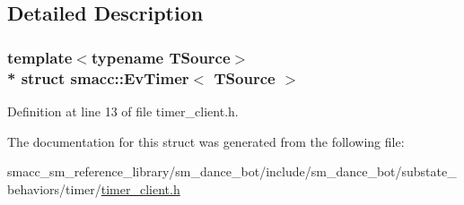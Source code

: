 \subsection{Detailed Description}
\subsubsection*{template$<$typename T\+Source$>$\\*
struct smacc\+::\+Ev\+Timer$<$ T\+Source $>$}



Definition at line 13 of file timer\+\_\+client.\+h.



The documentation for this struct was generated from the following file\+:\begin{DoxyCompactItemize}
\item 
smacc\+\_\+sm\+\_\+reference\+\_\+library/sm\+\_\+dance\+\_\+bot/include/sm\+\_\+dance\+\_\+bot/substate\+\_\+behaviors/timer/\hyperlink{timer__client_8h}{timer\+\_\+client.\+h}\end{DoxyCompactItemize}
